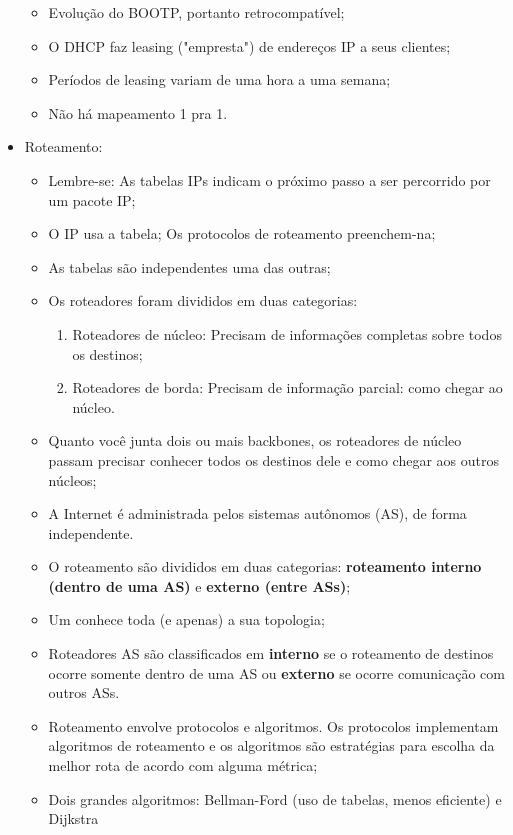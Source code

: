 \documentclass{article}
\begin{document}
\begin{itemize}
\begin{itemize}
         \item Evolução do BOOTP, portanto retrocompatível;
         \item O DHCP faz leasing ("empresta") de endereços IP a seus clientes;
         \item Períodos de leasing variam de uma hora a uma semana;
         \item Não há mapeamento 1 pra 1.
      \end{itemize}
   \item Roteamento:
      \begin{itemize}
         \item Lembre-se: As tabelas IPs indicam o próximo passo a ser percorrido por um pacote IP;
         \item O IP usa a tabela; Os protocolos de roteamento preenchem-na;
         \item As tabelas são independentes uma das outras;
         \item Os roteadores foram divididos em duas categorias:
            \begin{enumerate}
               \item Roteadores de núcleo: Precisam de informações completas sobre todos os
destinos;
               \item Roteadores de borda: Precisam de informação parcial: como chegar ao núcleo.
            \end{enumerate}
         \item Quanto você junta dois ou mais backbones, os roteadores de núcleo passam precisar
conhecer todos os destinos dele e como chegar aos outros núcleos;
         \item A Internet é administrada pelos sistemas autônomos (AS), de forma independente.
         \item O roteamento são divididos em duas categorias: \textbf{roteamento interno (dentro de
uma AS)} e \textbf{externo (entre ASs)};
         \item Um conhece toda (e apenas) a sua topologia;
         \item Roteadores AS são classificados em \textbf{interno} se o roteamento de destinos ocorre somente
dentro de uma AS ou \textbf{externo} se ocorre comunicação com outros ASs.
         \item Roteamento envolve protocolos e algoritmos. Os protocolos implementam algoritmos de
roteamento e os algoritmos são estratégias para escolha da melhor rota de acordo com alguma métrica;
         \item Dois grandes algoritmos: Bellman-Ford (uso de tabelas, menos eficiente) e Dijkstra

\end{itemize}
\end{itemize}
\end{document}

